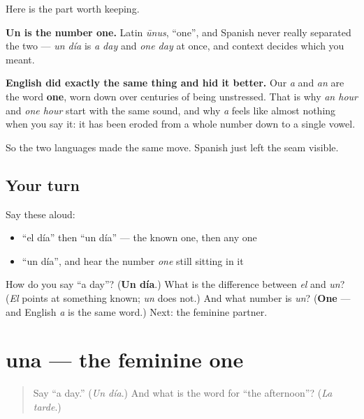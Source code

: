 \begin{cousinweb}
Here is the part worth keeping.

\textbf{Un is the number one.} Latin \emph{ūnus}, \textquotedblleft{}one\textquotedblright{}, and Spanish never really separated the two — \emph{un día} is \emph{a day} and \emph{one day} at once, and context decides which you meant.

\textbf{English did exactly the same thing and hid it better.} Our \emph{a} and \emph{an} are the word \textbf{one}, worn down over centuries of being unstressed. That is why \emph{an hour} and \emph{one hour} start with the same sound, and why \emph{a} feels like almost nothing when you say it: it has been eroded from a whole number down to a single vowel.

So the two languages made the same move. Spanish just left the seam visible.
\end{cousinweb}

\subsection*{Your turn}
Say these aloud:

\begin{itemize}
\raggedright
  \item \textquotedblleft{}el día\textquotedblright{} then \textquotedblleft{}un día\textquotedblright{} — the known one, then any one
  \item \textquotedblleft{}un día\textquotedblright{}, and hear the number \emph{one} still sitting in it
\end{itemize}

\begin{tcolorbox}[breakable,colback=teal!4,colframe=teal!35!black,title={Before you move on}]
How do you say \textquotedblleft{}a day\textquotedblright{}? (\textbf{Un día}.) What is the difference between \emph{el} and \emph{un}? (\emph{El} points at something known; \emph{un} does not.) And what number is \emph{un}? (\textbf{One} — and English \emph{a} is the same word.) Next: the feminine partner.
\end{tcolorbox}
\section[una]{una — the feminine one}

\label{lesson:ES-C02-una}



\begin{quote}
Say \textquotedblleft{}a day.\textquotedblright{} (\emph{Un día}.) And what is the word for \textquotedblleft{}the afternoon\textquotedblright{}? (\emph{La tarde}.)
\end{quote}

